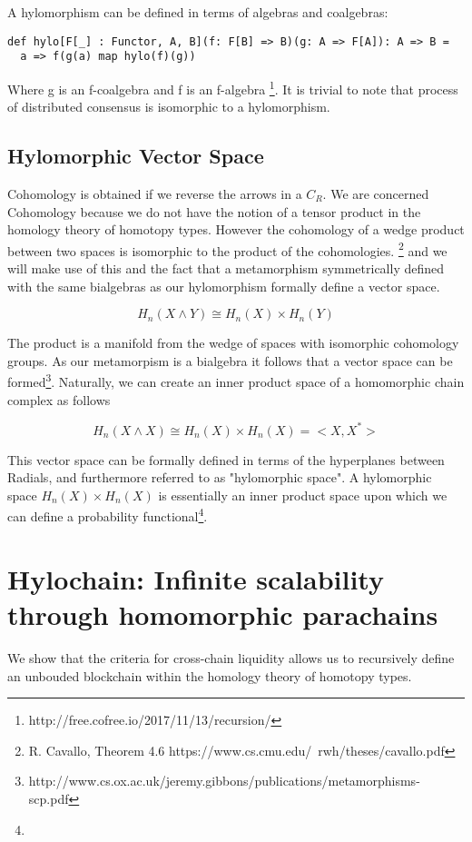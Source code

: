 \documentclass{article}
\begin{document}
A hylomorphism can be defined in terms of algebras and coalgebras:
\begin{lstlisting}
def hylo[F[_] : Functor, A, B](f: F[B] => B)(g: A => F[A]): A => B =
  a => f(g(a) map hylo(f)(g))
\end{lstlisting}
Where g is an f-coalgebra and f is an f-algebra \footnote{http://free.cofree.io/2017/11/13/recursion/}. It is trivial to note that process of distributed consensus is isomorphic to a hylomorphism. 

\subsection{Hylomorphic Vector Space}
Cohomology is obtained if we reverse the arrows in a $C_R$. We are concerned Cohomology because we do not have the notion of a tensor product in the homology theory of homotopy types. However the cohomology of a wedge product between two spaces is isomorphic to the product of the cohomologies. \footnote{R. Cavallo, Theorem 4.6 https://www.cs.cmu.edu/~rwh/theses/cavallo.pdf} and we will make use of this and the fact that a metamorphism symmetrically defined with the same bialgebras as our hylomorphism formally define a vector space.

\begin{equation} \label{eq1}
H_n(X \wedge Y) \cong H_n(X) \times H_n(Y)
\end{equation}

The product is a manifold from the wedge of spaces with isomorphic cohomology groups. As our metamorpism is a bialgebra it follows that a vector space can be formed\footnote{http://www.cs.ox.ac.uk/jeremy.gibbons/publications/metamorphisms-scp.pdf}. Naturally, we can create an inner product space of a homomorphic chain complex as follows

\begin{equation} \label{eq1}
H_n(X \wedge X) \cong H_n(X) \times H_n(X) = <X,X^*>
\end{equation}

This vector space can be formally defined in terms of the hyperplanes between Radials, and furthermore referred to as "hylomorphic space". A hylomorphic space $H_n(X) \times H_n(X)$ is essentially an inner product space upon which we can define a probability functional\footnote{}.

\section{Hylochain: Infinite scalability through homomorphic parachains}
We show that the criteria for cross-chain liquidity allows us to recursively define an unbouded blockchain within the homology theory of homotopy types.
\end{document}
